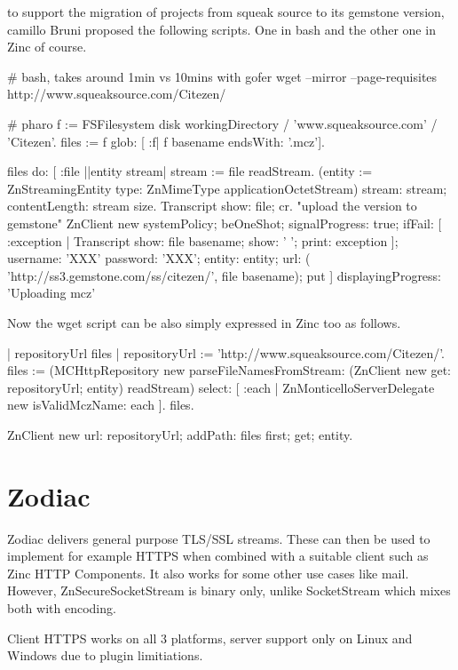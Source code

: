 \documentclass[a4paper,10pt,twoside]{book}
\begin{document}
to support the migration of projects from squeak source to its gemstone version, camillo Bruni proposed the following scripts. One in bash and the other one in Zinc of course. 

\begin{code}
# bash, takes around 1min vs 10mins with gofer
wget --mirror --page-requisites http://www.squeaksource.com/Citezen/
\end{code}

\begin{code}
# pharo 
f := FSFilesystem disk workingDirectory / 'www.squeaksource.com' / 'Citezen'.
files := f glob: [ :f| f basename endsWith: '.mcz'].

files do: [ :file ||entity stream|
	stream := file readStream.
	(entity := ZnStreamingEntity type: ZnMimeType applicationOctetStream)
		stream: stream;
		contentLength: stream size.
	Transcript show: file; cr.
	"upload the version to gemstone"
	ZnClient new
		systemPolicy;
		beOneShot;
		signalProgress: true;
		ifFail: [ :exception | Transcript show: file basename; show: ' '; print: exception ];
		username: 'XXX' password: 'XXX';
		entity: entity;
		url: ( 'http://ss3.gemstone.com/ss/citezen/', file basename);
		put ]
	displayingProgress: 'Uploading mcz'
\end{code}

Now the wget script can be also simply expressed in Zinc too as follows.

\begin{code}{}
| repositoryUrl files |
repositoryUrl := 'http://www.squeaksource.com/Citezen/'.
files := (MCHttpRepository new 
	parseFileNamesFromStream: (ZnClient new get: repositoryUrl; entity) readStream)
	select: [ :each | ZnMonticelloServerDelegate new isValidMczName: each ].
files.

ZnClient new
	url: repositoryUrl;
	addPath: files first;
	get;
	entity.
\end{code}




\section{Zodiac}
Zodiac delivers general purpose TLS/SSL streams.
These can then be used to implement for example HTTPS when combined with a suitable client such as Zinc HTTP Components.
It also works for some other use cases like mail.
However, ZnSecureSocketStream is binary only, unlike SocketStream which mixes both with encoding.


Client HTTPS works on all 3 platforms, server support only on Linux and Windows due to plugin limitiations. 
\end{document}
